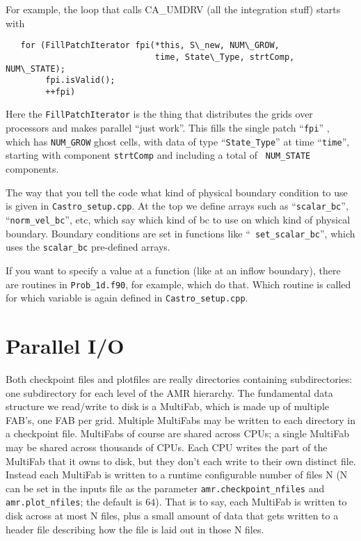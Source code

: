 For example, the loop that calls CA\_UMDRV (all the integration stuff) starts with
\begin{lstlisting}
   for (FillPatchIterator fpi(*this, S\_new, NUM\_GROW,
                              time, State\_Type, strtComp, NUM\_STATE);
        fpi.isValid();
        ++fpi)
\end{lstlisting}
Here the {\tt FillPatchIterator} is the thing that distributes the
grids over processors and makes parallel ``just work''. This fills the
single patch ``{\tt fpi}'' , which has {\tt NUM\_GROW} ghost cells,
with data of type ``{\tt State\_Type}'' at time ``{\tt time}'',
starting with component {\tt strtComp} and including a total of {\tt
  NUM\_STATE} components.

The way that you tell the code what kind of physical boundary
condition to use is given in {\tt Castro\_setup.cpp}. At the top we
define arrays such as ``{\tt scalar\_bc}'', ``{\tt norm\_vel\_bc}'',
etc, which say which kind of bc to use on which kind of physical
boundary.  Boundary conditions are set in functions like ``{\tt
  set\_scalar\_bc}'', which uses the {\tt scalar\_bc} pre-defined
arrays.

If you want to specify a value at a function (like at an inflow
boundary), there are routines in {\tt Prob\_1d.f90}, for example, which do
that. Which routine is called for which variable is again defined in
{\tt Castro\_setup.cpp}.

\section{Parallel I/O}

Both checkpoint files and plotfiles are really directories containing
subdirectories: one subdirectory for each level of the AMR hierarchy.
The fundamental data structure we read/write to disk is a MultiFab,
which is made up of multiple FAB's, one FAB per grid.  Multiple
MultiFabs may be written to each directory in a checkpoint file.
MultiFabs of course are shared across CPUs; a single MultiFab may be
shared across thousands of CPUs.  Each CPU writes the part of the
MultiFab that it owns to disk, but they don't each write to their own
distinct file.  Instead each MultiFab is written to a runtime
configurable number of files N (N can be set in the inputs file as the
parameter {\tt amr.checkpoint\_nfiles} and {\tt amr.plot\_nfiles}; the
default is 64).  That is to say, each MultiFab is written to disk
across at most N files, plus a small amount of data that gets written
to a header file describing how the file is laid out in those N files.

